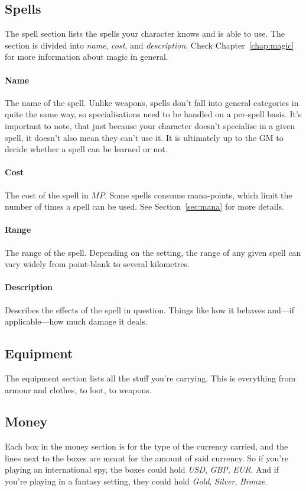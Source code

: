 \subsection{Spells}
The spell section lists the spells your character knows and is able to use.
The section is divided into \textit{name}, \textit{cost}, and \textit{description}.
Check Chapter~\ref{chap:magic} for more information about magic in general.

\paragraph{Name} The name of the spell.
Unlike weapons, spells don't fall into general categories in quite the same way, so specialisations need to be handled on a per-spell basis.
It's important to note, that just because your character doesn't specialise in a given spell, it doesn't also mean they can't use it.
It is ultimately up to the GM to decide whether a spell can be learned or not.

\paragraph{Cost} The cost of the spell in $MP$.
Some spells consume mana-points, which limit the number of times a spell can be used.
See Section~\ref{sec:mana} for more details.

\paragraph{Range} The range of the spell.
Depending on the setting, the range of any given spell can vary widely from point-blank to several kilometres.

\paragraph{Description} Describes the effects of the spell in question.
Things like how it behaves and---if applicable---how much damage it deals.

\subsection{Equipment}
The equipment section lists all the stuff you're carrying.
This is everything from armour and clothes, to loot, to weapons.

\subsection{Money}
Each box in the money section is for the type of the currency carried, and the lines next to the boxes are meant for the amount of said currency.
So if you're playing an international spy, the boxes could hold \textit{USD}, \textit{GBP}, \textit{EUR}.
And if you're playing in a fantasy setting, they could hold \textit{Gold}, \textit{Silver}, \textit{Bronze}.

